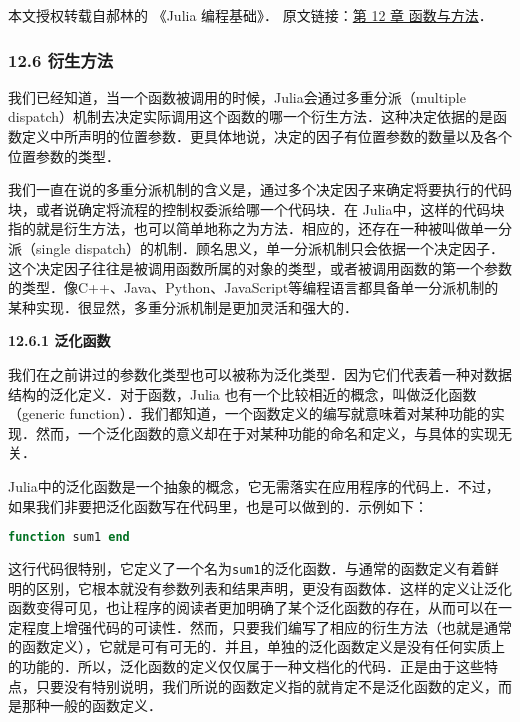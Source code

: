 
本文授权转载自郝林的 《Julia 编程基础》． 原文链接：\href{https://github.com/hyper0x/JuliaBasics/blob/master/book/ch12.md}{第 12 章 函数与方法}．


\subsubsection{12.6 衍生方法}

我们已经知道，当一个函数被调用的时候，Julia会通过多重分派（multiple dispatch）机制去决定实际调用这个函数的哪一个衍生方法．这种决定依据的是函数定义中所声明的位置参数．更具体地说，决定的因子有位置参数的数量以及各个位置参数的类型．

我们一直在说的多重分派机制的含义是，通过多个决定因子来确定将要执行的代码块，或者说确定将流程的控制权委派给哪一个代码块．在 Julia中，这样的代码块指的就是衍生方法，也可以简单地称之为方法．相应的，还存在一种被叫做单一分派（single dispatch）的机制．顾名思义，单一分派机制只会依据一个决定因子．这个决定因子往往是被调用函数所属的对象的类型，或者被调用函数的第一个参数的类型．像C++、Java、Python、JavaScript等编程语言都具备单一分派机制的某种实现．很显然，多重分派机制是更加灵活和强大的．

\textbf{12.6.1 泛化函数}

我们在之前讲过的参数化类型也可以被称为泛化类型．因为它们代表着一种对数据结构的泛化定义．对于函数，Julia 也有一个比较相近的概念，叫做泛化函数（generic function）．我们都知道，一个函数定义的编写就意味着对某种功能的实现．然而，一个泛化函数的意义却在于对某种功能的命名和定义，与具体的实现无关．

Julia中的泛化函数是一个抽象的概念，它无需落实在应用程序的代码上．不过，如果我们非要把泛化函数写在代码里，也是可以做到的．示例如下：

\begin{lstlisting}[language=julia]
function sum1 end
\end{lstlisting}

这行代码很特别，它定义了一个名为\verb|sum1|的泛化函数．与通常的函数定义有着鲜明的区别，它根本就没有参数列表和结果声明，更没有函数体．这样的定义让泛化函数变得可见，也让程序的阅读者更加明确了某个泛化函数的存在，从而可以在一定程度上增强代码的可读性．然而，只要我们编写了相应的衍生方法（也就是通常的函数定义），它就是可有可无的．并且，单独的泛化函数定义是没有任何实质上的功能的．所以，泛化函数的定义仅仅属于一种文档化的代码．正是由于这些特点，只要没有特别说明，我们所说的函数定义指的就肯定不是泛化函数的定义，而是那种一般的函数定义．

